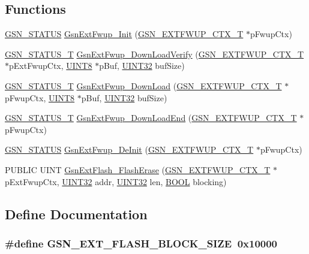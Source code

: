 \subsection*{Functions}
\begin{DoxyCompactItemize}
\item 
\hyperlink{a00660_gada5951904ac6110b1fa95e51a9ddc217}{GSN\_\-STATUS} \hyperlink{a00498_a9ee6111d439eca3eeb9470775e4d3910}{GsnExtFwup\_\-Init} (\hyperlink{a00072}{GSN\_\-EXTFWUP\_\-CTX\_\-T} $\ast$pFwupCtx)
\item 
\hyperlink{a00659_gae36517c0f5872426a7034c9551eb96ac}{GSN\_\-STATUS\_\-T} \hyperlink{a00498_a4a326a57356d543182fcbfe67be4350c}{GsnExtFwup\_\-DownLoadVerify} (\hyperlink{a00072}{GSN\_\-EXTFWUP\_\-CTX\_\-T} $\ast$pExtFwupCtx, \hyperlink{a00660_gab27e9918b538ce9d8ca692479b375b6a}{UINT8} $\ast$pBuf, \hyperlink{a00660_gae1e6edbbc26d6fbc71a90190d0266018}{UINT32} bufSize)
\item 
\hyperlink{a00659_gae36517c0f5872426a7034c9551eb96ac}{GSN\_\-STATUS\_\-T} \hyperlink{a00498_a3e2f6b52d3ff9652754a8abc3767e72d}{GsnExtFwup\_\-DownLoad} (\hyperlink{a00072}{GSN\_\-EXTFWUP\_\-CTX\_\-T} $\ast$pFwupCtx, \hyperlink{a00660_gab27e9918b538ce9d8ca692479b375b6a}{UINT8} $\ast$pBuf, \hyperlink{a00660_gae1e6edbbc26d6fbc71a90190d0266018}{UINT32} bufSize)
\item 
\hyperlink{a00659_gae36517c0f5872426a7034c9551eb96ac}{GSN\_\-STATUS\_\-T} \hyperlink{a00498_a73fe1535186ee6233c0edce343c4f926}{GsnExtFwup\_\-DownLoadEnd} (\hyperlink{a00072}{GSN\_\-EXTFWUP\_\-CTX\_\-T} $\ast$pFwupCtx)
\item 
\hyperlink{a00660_gada5951904ac6110b1fa95e51a9ddc217}{GSN\_\-STATUS} \hyperlink{a00498_aef5d0a4c1339b771940fc367432e9375}{GsnExtFwup\_\-DeInit} (\hyperlink{a00072}{GSN\_\-EXTFWUP\_\-CTX\_\-T} $\ast$pFwupCtx)
\item 
PUBLIC UINT \hyperlink{a00498_af093b84b108af9db04bdce0ed477f9b8}{GsnExtFlash\_\-FlashErase} (\hyperlink{a00072}{GSN\_\-EXTFWUP\_\-CTX\_\-T} $\ast$pExtFwupCtx, \hyperlink{a00660_gae1e6edbbc26d6fbc71a90190d0266018}{UINT32} addr, \hyperlink{a00660_gae1e6edbbc26d6fbc71a90190d0266018}{UINT32} len, \hyperlink{a00660_ga1f04022c0a182c51c059438790ea138c}{BOOL} blocking)
\end{DoxyCompactItemize}


\subsection{Define Documentation}
\hypertarget{a00498_ace68eb38afc72f76d4e0bc25e88e0849}{
\subsubsection[{GSN\_\-EXT\_\-FLASH\_\-BLOCK\_\-SIZE}]{\setlength{\rightskip}{0pt plus 5cm}\#define GSN\_\-EXT\_\-FLASH\_\-BLOCK\_\-SIZE~0x10000}}
\label{a00498_ace68eb38afc72f76d4e0bc25e88e0849}


